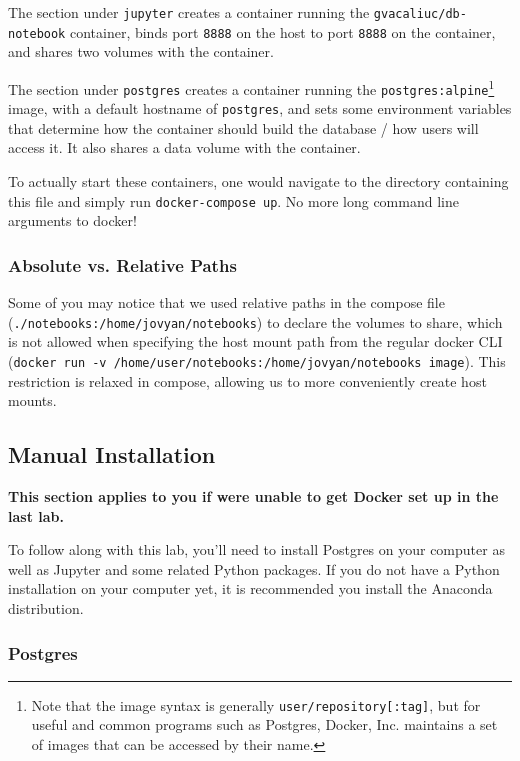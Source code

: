 \documentclass[paper=letter, fontsize=12pt]{article}
\numberwithin{equation}{section}
\numberwithin{figure}{section}
\numberwithin{table}{section}
\begin{document}
The section under \texttt{jupyter} creates a container
running the \texttt{gvacaliuc/db-notebook} container, binds port
\texttt{8888} on the host to port \texttt{8888} on the container, and shares
two volumes with the container.

The section under \texttt{postgres} creates a container running the
\texttt{postgres:alpine}\footnote{Note that the image syntax is generally
  \texttt{user/repository[:tag]}, but for useful and common programs such as
  Postgres, Docker, Inc. maintains a set of images that can be accessed by
  their name.} image, with a default hostname of \texttt{postgres}, and sets
some environment variables that determine how the container should build the
database / how users will access it.  It also shares a data volume with the
container.

To actually start these containers, one would navigate to the directory
containing this file and simply run \texttt{docker-compose up}.  No more long
command line arguments to docker!

\subsubsection{Absolute vs. Relative Paths}

Some of you may notice that we used relative paths in the compose file
(\texttt{./notebooks:/home/jovyan/notebooks}) to declare the volumes to share,
which is not allowed when specifying the host mount path from the regular
docker CLI (\texttt{docker run -v /home/user/notebooks:/home/jovyan/notebooks image}).
This restriction is relaxed in compose, allowing us to more conveniently create
host mounts.

\subsection{Manual Installation}

\textbf{
  This section applies to you if were unable to get Docker set up in the last
  lab.
}

To follow along with this lab, you'll need to install Postgres on your computer
as well as Jupyter and some related Python packages.  If you do not have a
Python installation on your computer yet, it is recommended you install the
Anaconda distribution.

\subsubsection{Postgres}
\end{document}

